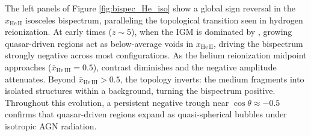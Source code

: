 \documentclass[apj,twocolumn, appendixfloats, twocolappendix, numberedappendix, tighten]{openjournal}
\begin{document}

The left panels of Figure \ref{fig:bispec_He_iso} show a global sign reversal in the $x_\mathrm{He\,II}$ isosceles bispectrum, paralleling the topological transition seen in hydrogen reionization. At early times ($z \sim 5$), when the IGM is dominated by , growing quasar-driven  regions act as below-average voids in $x_\mathrm{He\,II}$, driving the bispectrum strongly negative across most configurations. As the helium reionization midpoint approaches ($\bar{x}_\mathrm{He\,III} = 0.5$), contrast diminishes and the negative amplitude attenuates. Beyond $\bar{x}_\mathrm{He\,III} > 0.5$, the topology inverts: the  medium fragments into isolated structures within a  background, turning the bispectrum positive. Throughout this evolution, a persistent negative trough near $\cos\theta \approx -0.5$ confirms that quasar-driven  regions expand as quasi-spherical bubbles under isotropic AGN radiation.
\end{document}
